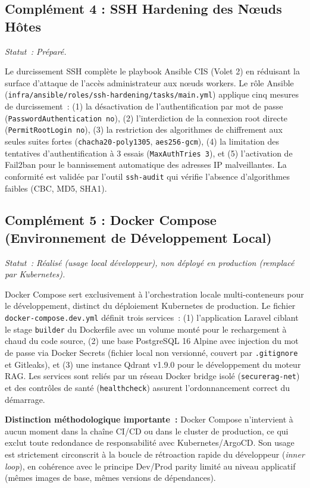 \subsection{Complément 4 : SSH Hardening des Nœuds Hôtes}
\label{subsec:comp_ssh_hardening}
\textit{Statut~: Préparé.}

Le durcissement SSH complète le playbook Ansible CIS (Volet 2) en réduisant la surface d'attaque de l'accès administrateur aux nœuds workers. Le rôle Ansible (\texttt{infra/ansible/roles/ssh-hardening/tasks/main.yml}) applique cinq mesures de durcissement~: (1) la désactivation de l'authentification par mot de passe (\texttt{PasswordAuthentication no}), (2) l'interdiction de la connexion root directe (\texttt{PermitRootLogin no}), (3) la restriction des algorithmes de chiffrement aux seules suites fortes (\texttt{chacha20-poly1305}, \texttt{aes256-gcm}), (4) la limitation des tentatives d'authentification à 3 essais (\texttt{MaxAuthTries 3}), et (5) l'activation de Fail2ban pour le bannissement automatique des adresses IP malveillantes. La conformité est validée par l'outil \texttt{ssh-audit} qui vérifie l'absence d'algorithmes faibles (CBC, MD5, SHA1).


\subsection{Complément 5 : Docker Compose (Environnement de Développement Local)}
\label{subsec:comp_docker_compose}
\textit{Statut~: Réalisé (usage local développeur), non déployé en production (remplacé par Kubernetes).}

Docker Compose sert exclusivement à l'orchestration locale multi-conteneurs pour le développement, distinct du déploiement Kubernetes de production. Le fichier \texttt{docker-compose.dev.yml} définit trois services~: (1) l'application Laravel ciblant le stage \texttt{builder} du Dockerfile avec un volume monté pour le rechargement à chaud du code source, (2) une base PostgreSQL 16 Alpine avec injection du mot de passe via Docker Secrets (fichier local non versionné, couvert par \texttt{.gitignore} et Gitleaks), et (3) une instance Qdrant v1.9.0 pour le développement du moteur RAG. Les services sont reliés par un réseau Docker bridge isolé (\texttt{securerag-net}) et des contrôles de santé (\texttt{healthcheck}) assurent l'ordonnancement correct du démarrage.

\textbf{Distinction méthodologique importante~:} Docker Compose n'intervient à aucun moment dans la chaîne CI/CD ou dans le cluster de production, ce qui exclut toute redondance de responsabilité avec Kubernetes/ArgoCD. Son usage est strictement circonscrit à la boucle de rétroaction rapide du développeur (\textit{inner loop}), en cohérence avec le principe Dev/Prod parity limité au niveau applicatif (mêmes images de base, mêmes versions de dépendances).


